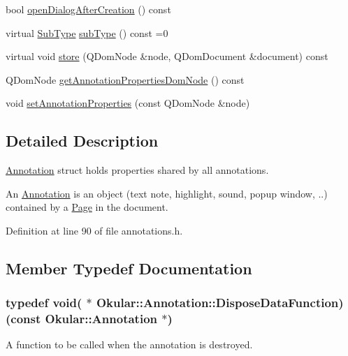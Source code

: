 \begin{DoxyCompactItemize}
\item 
bool \hyperlink{classOkular_1_1Annotation_a0dc9c020d3887707b383bdf5abb3c1c1}{open\+Dialog\+After\+Creation} () const 
\item 
virtual \hyperlink{classOkular_1_1Annotation_af71b46e37d5f850b97d5c4de3be9aac0}{Sub\+Type} \hyperlink{classOkular_1_1Annotation_af9833449767eacd740f377e69a1fdd48}{sub\+Type} () const =0
\item 
virtual void \hyperlink{classOkular_1_1Annotation_abbb607cf5929ffd06f789a22b353dcb3}{store} (Q\+Dom\+Node \&node, Q\+Dom\+Document \&document) const 
\item 
Q\+Dom\+Node \hyperlink{classOkular_1_1Annotation_ad7c117b9cc13d8987d2bcff8e4ed25f7}{get\+Annotation\+Properties\+Dom\+Node} () const 
\item 
void \hyperlink{classOkular_1_1Annotation_aea088e2d137bc017f0b78cce86642ff1}{set\+Annotation\+Properties} (const Q\+Dom\+Node \&node)
\end{DoxyCompactItemize}


\subsection{Detailed Description}
\hyperlink{classOkular_1_1Annotation}{Annotation} struct holds properties shared by all annotations. 

An \hyperlink{classOkular_1_1Annotation}{Annotation} is an object (text note, highlight, sound, popup window, ..) contained by a \hyperlink{classOkular_1_1Page}{Page} in the document. 

Definition at line 90 of file annotations.\+h.



\subsection{Member Typedef Documentation}
\hypertarget{classOkular_1_1Annotation_a4f2759100645cdce807944767937dd18}{
\subsubsection[{Dispose\+Data\+Function}]{\setlength{\rightskip}{0pt plus 5cm}typedef void( $\ast$  Okular\+::\+Annotation\+::\+Dispose\+Data\+Function)(const {\bf Okular\+::\+Annotation} $\ast$)}}\label{classOkular_1_1Annotation_a4f2759100645cdce807944767937dd18}
A function to be called when the annotation is destroyed.

